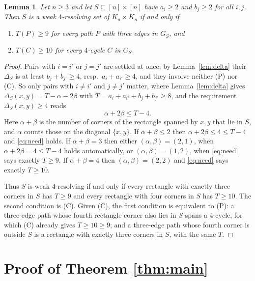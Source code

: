 \documentclass[11pt]{amsart}
\newtheorem{lemma}[theorem]{Lemma}
\theoremstyle{remark}
\begin{document}
\begin{lemma}\label{lem:crit}
Let $n\ge3$ and let $S\subseteq[n]\times[n]$ have $a_i\ge2$ and $b_j\ge2$ for
all $i,j$. Then $S$ is a weak $4$-resolving set of $K_n\times K_n$ if and only
if
\begin{enumerate}
\item[\textup{(P)}] $T(P)\ge9$ for every path $P$ with three edges in $G_S$,
      and
\item[\textup{(C)}] $T(C)\ge10$ for every $4$-cycle $C$ in $G_S$.
\end{enumerate}
\end{lemma}

\begin{proof}
Pairs with $i=i'$ or $j=j'$ are settled at once: by Lemma~\ref{lem:delta} their
$\Delta_S$ is at least $b_j+b_{j'}\ge4$, resp.\ $a_i+a_{i'}\ge4$, and they
involve neither (P) nor (C). So only pairs with $i\ne i'$ and $j\ne j'$ matter,
where Lemma~\ref{lem:delta} gives $\Delta_S(x,y)=T-\alpha-2\beta$ with
$T=a_i+a_{i'}+b_j+b_{j'}\ge8$, and the requirement $\Delta_S(x,y)\ge4$ reads
\begin{equation}\label{eq:need}
  \alpha+2\beta\le T-4 .
\end{equation}
Here $\alpha+\beta$ is the number of corners of the rectangle spanned by
$x,y$ that lie in $S$, and $\alpha$ counts those on the diagonal $\{x,y\}$.
If $\alpha+\beta\le2$ then $\alpha+2\beta\le4\le T-4$ and \eqref{eq:need}
holds. If $\alpha+\beta=3$ then either $(\alpha,\beta)=(2,1)$, when
$\alpha+2\beta=4\le T-4$ holds automatically, or $(\alpha,\beta)=(1,2)$, when
\eqref{eq:need} says exactly $T\ge9$. If $\alpha+\beta=4$ then
$(\alpha,\beta)=(2,2)$ and \eqref{eq:need} says exactly $T\ge10$.

Thus $S$ is weak $4$-resolving if and only if every rectangle with exactly
three corners in $S$ has $T\ge9$ and every rectangle with four corners in $S$
has $T\ge10$. The second condition is (C). Given (C), the first condition is
equivalent to (P): a three-edge path whose fourth rectangle corner also lies in
$S$ spans a $4$-cycle, for which (C) already gives $T\ge10\ge9$; and a
three-edge path whose fourth corner is outside $S$ is a rectangle with exactly
three corners in $S$, with the same $T$.
\end{proof}

\section{Proof of Theorem \ref{thm:main}}\label{sec:upper}
\end{document}
